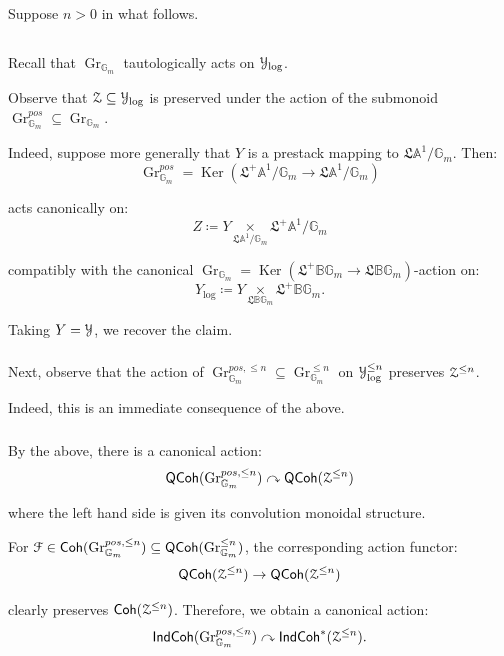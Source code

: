 \documentclass[reqno,11pt]{amsart}
\numberwithin{equation}{subsection}
\theoremstyle{remark}
\newcommand{\bA}{{\mathbb A}}
\newcommand{\bB}{{\mathbb B}}
\newcommand{\bG}{{\mathbb G}}
\newcommand{\sF}{{\EuScript F}}
\newcommand{\sY}{{\EuScript Y}}
\newcommand{\sZ}{{\EuScript Z}}
\newcommand{\fL}{{\mathfrak L}}
\newcommand{\on}{\operatorname}
\newcommand{\Ker}{\on{Ker}}
\newcommand{\actson}{\curvearrowright}
\newcommand{\Gr}{\on{Gr}}
\newcommand{\Coh}{\mathsf{Coh}}
\newcommand{\IndCoh}{\mathsf{IndCoh}}
\newcommand{\QCoh}{\mathsf{QCoh}}
\renewcommand{\subset}{\subseteq}
\begin{document}
Suppose $n>0$ in what follows. 

\subsection{}

Recall that $\Gr_{\bG_m}$ tautologically acts on $\sY_{\log}$.

Observe that $\sZ \subset \sY_{\log}$ is preserved
under the action of the submonoid 
$\Gr_{\bG_m}^{pos} \subset \Gr_{\bG_m}$.

Indeed, suppose more generally that $Y$ is a prestack
mapping to $\fL \bA^1/\bG_m$. Then:
%
\[
\Gr_{\bG_m}^{pos} = \Ker(\fL^+ \bA^1/\bG_m \to \fL \bA^1/\bG_m)
\]

\noindent acts canonically on:
%
\[
Z \coloneqq Y \underset{\fL \bA^1/\bG_m}{\times} \fL^+ \bA^1/\bG_m
\]

\noindent compatibly with the canonical $\Gr_{\bG_m} = 
\Ker(\fL^+\bB \bG_m \to \fL \bB \bG_m)$-action on:
%
\[
Y_{\log} \coloneqq Y \underset{\fL\bB\bG_m}{\times} \fL^+ \bB \bG_m.
\]

Taking $Y = \sY$, we recover the claim.

\subsubsection{}

Next, observe that the action of 
$\Gr_{\bG_m}^{pos,\leq n} \subset \Gr_{\bG_m}^{\leq n}$
on $\sY_{\log}^{\leq n}$ preserves $\sZ^{\leq n}$.

Indeed, this is an immediate consequence of the above.

\subsubsection{}

By the above, there is a canonical action:
%
\[
\QCoh(\Gr_{\bG_m}^{pos,\leq n}) \actson \QCoh(\sZ^{\leq n})
\]

\noindent where the left hand side is given its convolution monoidal
structure. 

For $\sF \in \Coh(\Gr_{\bG_m}^{pos,\leq n}) \subset \QCoh(\Gr_{\bG_m}^{\leq n})$,
the corresponding action functor:
%
\[
\QCoh(\sZ^{\leq n}) \to \QCoh(\sZ^{\leq n})
\]

\noindent clearly preserves $\Coh(\sZ^{\leq n})$. Therefore, we obtain 
a canonical action:
%
\[
\IndCoh(\Gr_{\bG_m}^{pos,\leq n}) \actson \IndCoh^*(\sZ^{\leq n}).
\]
\end{document}
